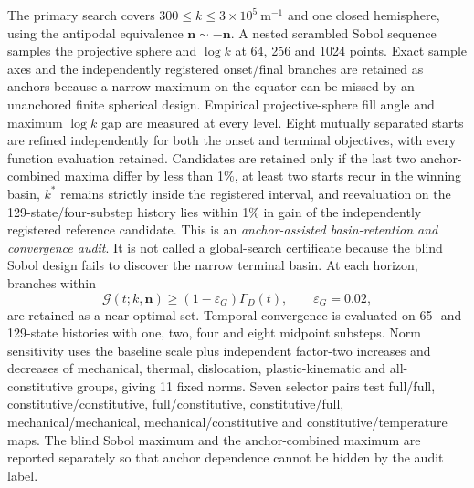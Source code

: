 The primary search covers $300\le k\le3\times10^5~\mathrm{m^{-1}}$ and one closed hemisphere, using the antipodal equivalence $\boldsymbol n\sim-\boldsymbol n$. A nested scrambled Sobol sequence samples the projective sphere and $\log k$ at 64, 256 and 1024 points. Exact sample axes and the independently registered onset/final branches are retained as anchors because a narrow maximum on the equator can be missed by an unanchored finite spherical design. Empirical projective-sphere fill angle and maximum $\log k$ gap are measured at every level. Eight mutually separated starts are refined independently for both the onset and terminal objectives, with every function evaluation retained. Candidates are retained only if the last two anchor-combined maxima differ by less than 1\%, at least two starts recur in the winning basin, $k^*$ remains strictly inside the registered interval, and reevaluation on the 129-state/four-substep history lies within 1\% in gain of the independently registered reference candidate. This is an \emph{anchor-assisted basin-retention and convergence audit}. It is not called a global-search certificate because the blind Sobol design fails to discover the narrow terminal basin. At each horizon, branches within
\begin{equation}
 \mathcal G(t;k,\boldsymbol n)\ge(1-\varepsilon_G)\Gamma_D(t),
 \qquad \varepsilon_G=0.02,
 \label{eq:ft_near_optimal_gate}
\end{equation}
are retained as a near-optimal set. Temporal convergence is evaluated on 65- and 129-state histories with one, two, four and eight midpoint substeps. Norm sensitivity uses the baseline scale plus independent factor-two increases and decreases of mechanical, thermal, dislocation, plastic-kinematic and all-constitutive groups, giving 11 fixed norms. Seven selector pairs test full/full, constitutive/constitutive, full/constitutive, constitutive/full, mechanical/mechanical, mechanical/constitutive and constitutive/temperature maps. The blind Sobol maximum and the anchor-combined maximum are reported separately so that anchor dependence cannot be hidden by the audit label.

